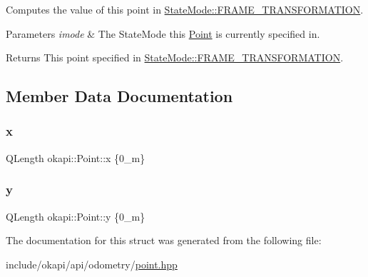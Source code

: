 Computes the value of this point in {\ttfamily \mbox{\hyperlink{namespaceokapi_af37fbd761bd859a00ff4dd4a87dd8c07ad5ed7666e5cebf60d3af20a5a46edf3b}{State\+Mode\+::\+F\+R\+A\+M\+E\+\_\+\+T\+R\+A\+N\+S\+F\+O\+R\+M\+A\+T\+I\+ON}}}.


\begin{DoxyParams}{Parameters}
{\em imode} & The State\+Mode this \mbox{\hyperlink{structokapi_1_1Point}{Point}} is currently specified in. \\
\hline
\end{DoxyParams}
\begin{DoxyReturn}{Returns}
This point specified in {\ttfamily \mbox{\hyperlink{namespaceokapi_af37fbd761bd859a00ff4dd4a87dd8c07ad5ed7666e5cebf60d3af20a5a46edf3b}{State\+Mode\+::\+F\+R\+A\+M\+E\+\_\+\+T\+R\+A\+N\+S\+F\+O\+R\+M\+A\+T\+I\+ON}}}. 
\end{DoxyReturn}


\subsection{Member Data Documentation}
\mbox{\label{structokapi_1_1Point_a49a37b80b4c067214556e3da3532d2ac}} 
\subsubsection{\texorpdfstring{x}{x}}
{\footnotesize\ttfamily Q\+Length okapi\+::\+Point\+::x \{0\+\_\+m\}}

\mbox{\label{structokapi_1_1Point_a6acb599ade55d1df76ad805ac6bb174d}} 
\subsubsection{\texorpdfstring{y}{y}}
{\footnotesize\ttfamily Q\+Length okapi\+::\+Point\+::y \{0\+\_\+m\}}



The documentation for this struct was generated from the following file\+:\begin{DoxyCompactItemize}
\item 
include/okapi/api/odometry/\mbox{\hyperlink{point_8hpp}{point.\+hpp}}\end{DoxyCompactItemize}
